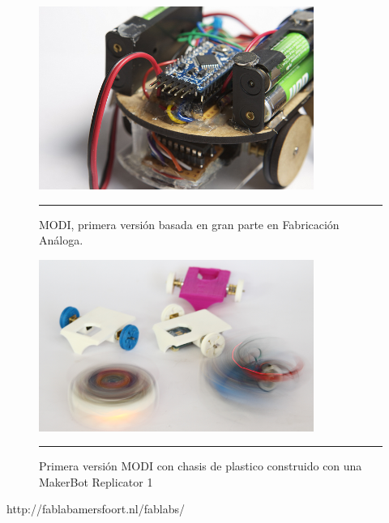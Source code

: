 \begin{figure}[htbp]
	\centering
		\includegraphics[width=0.8\textwidth]{./Pictures/2MODIrev1.jpg}
		\rule{35em}{0.5pt}
	\caption[modi2]{MODI, primera versión basada en gran parte en Fabricación Análoga.}
	\label{fig:modi2}
\end{figure}

\begin{figure}[htbp]
	\centering
		\includegraphics[width=0.8\textwidth]{./Pictures/MODIrev2.png}
		\rule{35em}{0.5pt}
	\caption[modirev1]{Primera versión MODI con chasis de plastico construido con una MakerBot Replicator 1}
	\label{fig:modirev2}
\end{figure}

http://fablabamersfoort.nl/fablabs/





